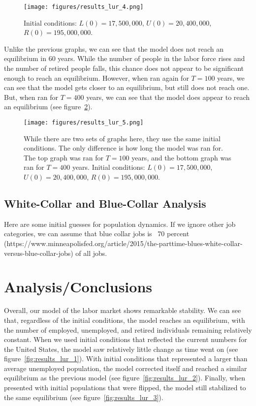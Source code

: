 \documentclass[11pt]{amsart}
\begin{document}
\begin{figure}[h]
    \centering
    \texttt{[image: figures/results\_lur\_4.png]}
    \caption{Initial conditions: $L(0) = 17,500,000$, $U(0) = 20,400,000$, $R(0) = 195,000,000$.}
    \label{fig:results_lur_4}
\end{figure}

Unlike the previous graphs, we can see that the model does not reach an equilibrium in 60 years. 
While the number of people in the labor force rises and the number of retired people falls, 
this chance does not appear to be significant enough to reach an equilibrium. However,
when ran again for $T = 100$ years, we can see that the model gets closer to an equilibrium, but 
still does not reach one. But, when ran for $T = 400$ years, we can see that the model 
does appear to reach an equilibrium (see figure~\ref{fig:results_lur_5}).

\begin{figure}[h]
    \centering
    \texttt{[image: figures/results\_lur\_5.png]}
    \caption{While there are two sets of graphs here, they use the same initial conditions.
            The only difference is how long the model was ran for. The top graph was ran for $T = 100$ years, and 
            the bottom graph was ran for $T = 400$ years.
            Initial conditions: $L(0) = 17,500,000$, $U(0) = 20,400,000$, $R(0) = 195,000,000$.}
    \label{fig:results_lur_5}
\end{figure}


\subsection{White-Collar and Blue-Collar Analysis}

Here are some initial guesses for population dynamics. If we ignore other job categories, we can assume that blue collar jobs is 
~70 percent (https://www.minneapolisfed.org/article/2015/the-parttime-blues-white-collar-versus-blue-collar-jobs) of all jobs.


\section{Analysis/Conclusions}

Overall, our model of the labor market shows remarkable stability. 
We can see that, regardless of the initial conditions, the model reaches an equilibrium, 
with the number of employed, unemployed, and retired individuals remaining relatively constant.
When we used initial conditions that reflected the current numbers for the United States,
the model saw relatively little change as time went on (see figure~\ref{fig:results_lur_1}).
With initial conditions that represented a larger than average unemployed population, the model corrected itself and reached a
similar equilibrium as the previous model (see figure~\ref{fig:results_lur_2}).
Finally, when presented with initial populations that were flipped, the model still stabilized to the same equilibrium
(see figure~\ref{fig:results_lur_3}).
\end{document}
